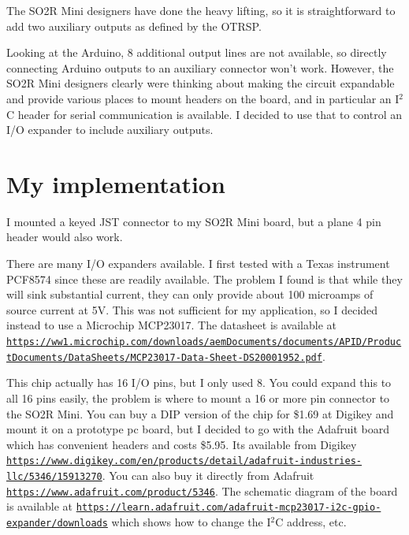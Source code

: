 \documentclass[12pt]{article}
\begin{document}
The SO2R Mini designers have done the heavy lifting, so it is straightforward
to add two auxiliary outputs as defined by the OTRSP.

Looking at the Arduino, 8 additional output lines are not available, so
directly connecting Arduino outputs to an auxiliary connector won't work.
However,
the SO2R Mini designers clearly were thinking about making the circuit
expandable and provide various places to mount
headers on the board, and in particular an I$^2$C header for
serial communication is available. I decided to use that to control
an I/O expander to include auxiliary outputs.

\section{My implementation}
I mounted a keyed JST connector to my
SO2R Mini board, but a plane 4 pin header would also work.

There are many I/O expanders available. I first tested with a
Texas instrument PCF8574 since these are readily available.
The problem I found is that while they will sink substantial current,
they can only provide about 100 microamps of source current at 5V.
This was not sufficient for my application, so I decided instead to
use a Microchip
MCP23017. The datasheet is available at
\href{https://ww1.microchip.com/downloads/aemDocuments/documents/APID/ProductDocuments/DataSheets/MCP23017-Data-Sheet-DS20001952.pdf}
{\nolinkurl{https://ww1.microchip.com/downloads/aemDocuments/documents/APID/ProductDocuments/DataSheets/MCP23017-Data-Sheet-DS20001952.pdf}}.


This chip actually has 16 I/O pins, but I only used 8. You could expand
this to all 16 pins easily, the problem is where to mount a 16 or more pin
connector to the SO2R Mini.
You can buy a DIP version of the chip for \$1.69
at Digikey and mount it on a prototype pc board, but I decided to go
with the Adafruit board which has convenient
headers and costs \$5.95. Its available from Digikey
\href{https://www.digikey.com/en/products/detail/adafruit-industries-llc/5346/15913270}
{\nolinkurl{https://www.digikey.com/en/products/detail/adafruit-industries-llc/5346/15913270}}.
You can also buy it directly from Adafruit
\href{https://www.adafruit.com/product/5346}
{\nolinkurl{https://www.adafruit.com/product/5346}}.
The schematic diagram of the board is available at
\href{https://learn.adafruit.com/adafruit-mcp23017-i2c-gpio-expander/downloads}
{\nolinkurl{https://learn.adafruit.com/adafruit-mcp23017-i2c-gpio-expander/downloads}}
which shows how to change the I$^2$C address, etc.
\end{document}
